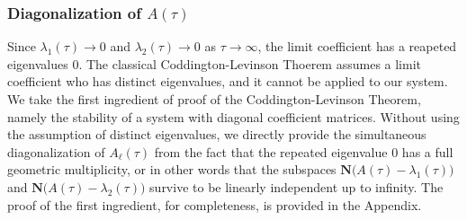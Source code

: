 \documentclass[a4paper,11pt]{article}
\theoremstyle{remark}
\begin{document}
\subsubsection{Diagonalization of $A(\tau)$}
Since $\lambda_1(\tau) \rightarrow 0$ and $\lambda_2(\tau) \rightarrow 0$ as $\tau \rightarrow \infty$, the limit coefficient has a reapeted eigenvalues $0$. The classical Coddington-Levinson Thoerem assumes a limit coefficient who has distinct eigenvalues, and it cannot be applied to our system. We take the first ingredient of proof of the Coddington-Levinson Theorem, namely the stability of a system with diagonal coefficient matrices. Without using the assumption of distinct eigenvalues, we directly provide the simultaneous diagonalization of $A_\ell(\tau)$ from the fact that the repeated eigenvalue $0$ has a full geometric multiplicity, or in other words that the subspaces $\mathbf{N}\Big(A(\tau)-\lambda_1(\tau)\Big)$ and  $\mathbf{N}\Big(A(\tau)-\lambda_2(\tau)\Big)$ survive to be linearly independent up to infinity. The proof of the first ingredient, for completeness, is provided in the Appendix.
\end{document}
